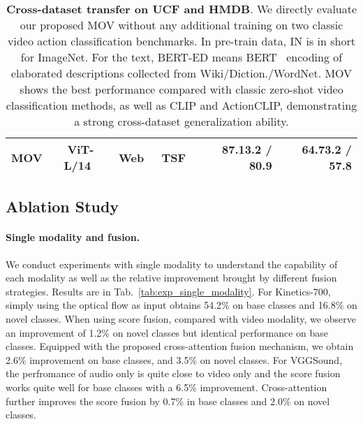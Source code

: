 \documentclass{article}
\begin{document}
\begin{table}[t]
\begin{tabular}{lcccrr}
MOV & ViT-L/14~\cite{dosovitskiy2020image} & Web~\cite{radford2021learning} & TSF~\cite{vaswani2017attention} & \textbf{87.13.2} / \textbf{80.9} & \textbf{64.73.2} / \textbf{57.8}  \\
\bottomrule 
\end{tabular}
\caption{\textbf{Cross-dataset transfer on UCF and HMDB}. We directly evaluate our proposed MOV without any additional training on two classic video action classification benchmarks. In pre-train data, IN is in short for ImageNet. For the text, BERT-ED means BERT~\cite{devlin2018bert} encoding of elaborated descriptions collected from Wiki/Diction./WordNet. MOV shows the best performance compared with classic zero-shot video classification methods, as well as CLIP and ActionCLIP, demonstrating a strong cross-dataset generalization ability.}
\label{tab:exp_cross_dataset}
\end{table}

\subsection{Ablation Study}
\paragraph{Single modality and fusion.} 
We conduct experiments with single modality to understand the capability of each modality as well as the relative improvement brought by different fusion strategies. 
Results are in Tab.~\ref{tab:exp_single_modality}. 
For Kinetics-700, simply using the optical flow as input obtains 54.2\% on base classes and 16.8\% on novel classes. 
When using score fusion, compared with video modality, we observe an improvement of 1.2\% on novel classes but identical performance on base classes. 
Equipped with the proposed cross-attention fusion mechanism, we obtain 2.6\% improvement on base classes, and 3.5\% on novel classes. 
For VGGSound, the perfromance of audio only is quite close to video only and the score fusion works quite well for base classes with a 6.5\% improvement. Cross-attention further improves the score fusion by 0.7\% in base classes and 2.0\% on novel classes.
\end{document}
